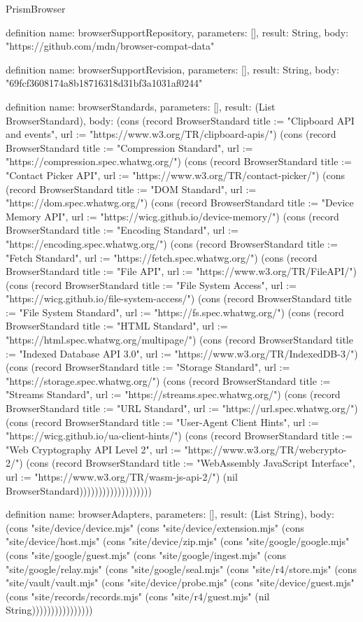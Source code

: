 \begin{lexlean}{PrismBrowser}
\begin{semanticmodule}
definition{
  name: browserSupportRepository,
  parameters: [],
  result: String,
  body: "https://github.com/mdn/browser-compat-data"
}

definition{
  name: browserSupportRevision,
  parameters: [],
  result: String,
  body: "69fcf3608174a8b18716318d31bf3a1031af0244"
}

definition{
  name: browserStandards,
  parameters: [],
  result: (List BrowserStandard),
  body: (cons (record BrowserStandard {title := "Clipboard API and events", url := "https://www.w3.org/TR/clipboard-apis/"}) (cons (record BrowserStandard {title := "Compression Standard", url := "https://compression.spec.whatwg.org/"}) (cons (record BrowserStandard {title := "Contact Picker API", url := "https://www.w3.org/TR/contact-picker/"}) (cons (record BrowserStandard {title := "DOM Standard", url := "https://dom.spec.whatwg.org/"}) (cons (record BrowserStandard {title := "Device Memory API", url := "https://wicg.github.io/device-memory/"}) (cons (record BrowserStandard {title := "Encoding Standard", url := "https://encoding.spec.whatwg.org/"}) (cons (record BrowserStandard {title := "Fetch Standard", url := "https://fetch.spec.whatwg.org/"}) (cons (record BrowserStandard {title := "File API", url := "https://www.w3.org/TR/FileAPI/"}) (cons (record BrowserStandard {title := "File System Access", url := "https://wicg.github.io/file-system-access/"}) (cons (record BrowserStandard {title := "File System Standard", url := "https://fs.spec.whatwg.org/"}) (cons (record BrowserStandard {title := "HTML Standard", url := "https://html.spec.whatwg.org/multipage/"}) (cons (record BrowserStandard {title := "Indexed Database API 3.0", url := "https://www.w3.org/TR/IndexedDB-3/"}) (cons (record BrowserStandard {title := "Storage Standard", url := "https://storage.spec.whatwg.org/"}) (cons (record BrowserStandard {title := "Streams Standard", url := "https://streams.spec.whatwg.org/"}) (cons (record BrowserStandard {title := "URL Standard", url := "https://url.spec.whatwg.org/"}) (cons (record BrowserStandard {title := "User-Agent Client Hints", url := "https://wicg.github.io/ua-client-hints/"}) (cons (record BrowserStandard {title := "Web Cryptography API Level 2", url := "https://www.w3.org/TR/webcrypto-2/"}) (cons (record BrowserStandard {title := "WebAssembly JavaScript Interface", url := "https://www.w3.org/TR/wasm-js-api-2/"}) (nil BrowserStandard)))))))))))))))))))
}

definition{
  name: browserAdapters,
  parameters: [],
  result: (List String),
  body: (cons "site/device/device.mjs" (cons "site/device/extension.mjs" (cons "site/device/host.mjs" (cons "site/device/zip.mjs" (cons "site/google/google.mjs" (cons "site/google/guest.mjs" (cons "site/google/ingest.mjs" (cons "site/google/relay.mjs" (cons "site/google/seal.mjs" (cons "site/r4/store.mjs" (cons "site/vault/vault.mjs" (cons "site/device/probe.mjs" (cons "site/device/guest.mjs" (cons "site/records/records.mjs" (cons "site/r4/guest.mjs" (nil String))))))))))))))))
}


\end{semanticmodule}
\end{lexlean}
